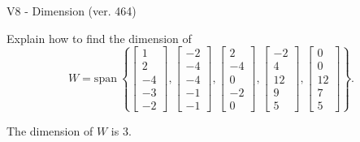 \begin{exercise}
  \begin{exerciseTitle}V8 - Dimension (ver. 464)\end{exerciseTitle}
  \begin{exerciseStatement}
    Explain how to find the dimension of 
\[W=\mathrm{span}\ \left\{\left[\begin{array}{r}
1 \\
2 \\
-4 \\
-3 \\
-2
\end{array}\right] , \left[\begin{array}{r}
-2 \\
-4 \\
-4 \\
-1 \\
-1
\end{array}\right] , \left[\begin{array}{r}
2 \\
-4 \\
0 \\
-2 \\
0
\end{array}\right] , \left[\begin{array}{r}
-2 \\
4 \\
12 \\
9 \\
5
\end{array}\right] , \left[\begin{array}{r}
0 \\
0 \\
12 \\
7 \\
5
\end{array}\right]\right\}.\]



  \end{exerciseStatement}
  \begin{exerciseAnswer}
   The dimension of \(W\) is  \(3\).
  


  \end{exerciseAnswer}
\end{exercise}